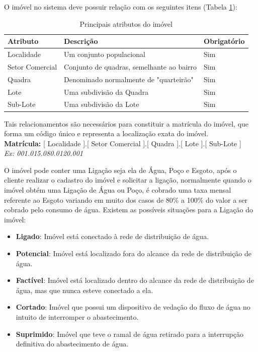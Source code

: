 O imóvel no sistema deve possuir relação com os seguintes itens (Tabela \ref{tabela:atributosImovel}):
\begin{table}[H]
	\center
	\footnotesize
	\caption{Principais atributos do imóvel}
	\label{tabela:atributosImovel}
	\begin{tabular}{|p{3cm}|p{7cm}|p{2.5cm}|} \hline
		\textbf{Atributo} 	& \textbf{Descrição}						& \textbf{Obrigatório}  \\ \hline
		Localidade 			& Um conjunto populacional					& Sim \\	\hline
		Setor Comercial 	& Conjunto de quadras, semelhante ao bairro & Sim \\ 	\hline
		Quadra 				& Denominado normalmente de "quarteirão" 	& Sim \\ 	\hline			
		Lote 				&  Uma subdivisão da Quadra 				& Sim \\ 	\hline
		Sub-Lote 			&  Uma subdivisão da Lote 					& Sim \\ 	\hline
	\end{tabular}
\end{table}


Tais relacionamentos são necessários para constituir a matrícula do imóvel, que forma um código único e representa a localização exata do imóvel.\\
\textbf{Matrícula:} [ Localidade ].[ Setor Comercial ].[ Quadra ].[ Lote ].[ Sub-Lote ]  \\
\textit{Ex: 001.015.080.0120.001}

O imóvel pode conter uma Ligação seja ela de Água, Poço e Esgoto, após o cliente realizar o cadastro do imóvel e solicitar a ligação, normalmente quando o imóvel obtém uma Ligação de Água ou Poço, é cobrado uma taxa mensal referente ao Esgoto variando em muito dos casos de 80\% a 100\% do valor a ser cobrado pelo consumo de água. Existem as possíveis situações para a Ligação do imóvel:
\begin{itemize}
	\item \textbf{Ligado}: Imóvel está conectado à rede de distribuição de água.
	\item \textbf{Potencial}: Imóvel está localizado fora do alcance da rede de distribuição de água.
	\item \textbf{Factível}: Imóvel está localizado dentro do alcance da rede de distribuição de água, mas que nunca esteve conectado a ela.
	\item \textbf{Cortado}: Imóvel que possui um dispositivo de vedação do fluxo de água no intuito de interromper o abastecimento.
	\item \textbf{Suprimido}: Imóvel que teve o ramal de água retirado para a interrupção definitiva do abastecimento de água.	
\end{itemize}

